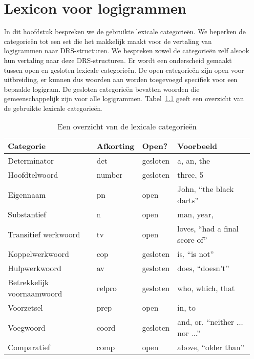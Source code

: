 \chapter{Lexicon voor logigrammen}
In dit hoofdstuk bespreken we de gebruikte lexicale categorieën. We beperken de categorieën tot een set die het makkelijk maakt voor de vertaling van logigrammen naar DRS-structuren. We bespreken zowel de categorieën zelf alsook hun vertaling naar deze DRS-structuren. Er wordt een onderscheid gemaakt tussen open en gesloten lexicale categorieën. De open categorieën zijn open voor uitbreiding, er kunnen dus woorden aan worden toegevoegd specifiek voor een bepaalde logigram. De gesloten categorieën bevatten woorden die gemeenschappelijk zijn voor alle logigrammen. Tabel~\ref{tbl:lexiconCategories} geeft een overzicht van de gebruikte lexicale categorieën.

\begin{table}[t]
  \centering
  \begin{tabular}{llll}
    \toprule
    \textbf{Categorie} & \textbf{Afkorting} & \textbf{Open?} & \textbf{Voorbeeld}  \\ \midrule
    Determinator       & det                & gesloten & a, an, the \\
    Hoofdtelwoord      & number             & gesloten & three, 5      \\
    Eigennaam          & pn                 & open     & John, ``the black darts'' \\
    Substantief        & n                  & open     & man, year, \\
    Transitief werkwoord & tv               & open     & loves, ``had a final score of'' \\
    Koppelwerkwoord    & cop                & gesloten & is, ``is not'' \\
    Hulpwerkwoord      & av                 & gesloten & does, ``doesn't'' \\
    Betrekkelijk voornaamwoord & relpro     & gesloten & who, which, that \\
    Voorzetsel         & prep               & open     & in, to \\
    Voegwoord          & coord              & gesloten & and, or, ``neither ... nor ...'' \\
    Comparatief        & comp               & open     & above, ``older than'' \\
    \bottomrule
  \end{tabular}
  \caption{Een overzicht van de lexicale categorieën}
  \label{tbl:lexiconCategories}
\end{table}

